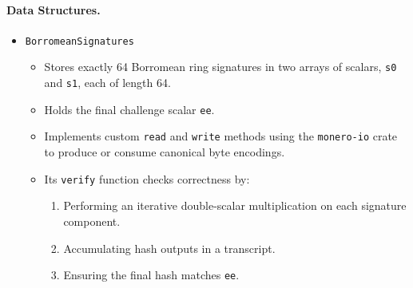 \paragraph{Data Structures.}
\begin{itemize}
  \item \texttt{BorromeanSignatures}
  \begin{itemize}
    \item Stores exactly 64 Borromean ring signatures in two arrays of scalars, \texttt{s0} and \texttt{s1}, each of length 64.
    \item Holds the final challenge scalar \texttt{ee}.
    \item Implements custom \texttt{read} and \texttt{write} methods using the \texttt{monero-io} crate to produce or consume canonical byte encodings. %
    \item Its \texttt{verify} function checks correctness by: %
      \begin{enumerate}[label=(\alph*)]
        \item Performing an iterative double-scalar multiplication on each signature component. %
        \item Accumulating hash outputs in a transcript. %
        \item Ensuring the final hash matches \texttt{ee}. %
      \end{enumerate}
  \end{itemize}


\end{itemize}
